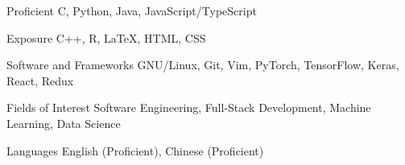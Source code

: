 

\begin{cvskills}

  \cvskill
    {Proficient} %
    {C, Python, Java, JavaScript/TypeScript} %

  \cvskill
    {Exposure} %
    {C++, R, LaTeX, HTML, CSS} %

  \cvskill
    {Software and Frameworks} %
    {GNU/Linux, Git, Vim, PyTorch, TensorFlow, Keras, React, Redux} %

  \cvskill
    {Fields of Interest} %
    {Software Engineering, Full-Stack Development, Machine Learning, Data Science} %

  \cvskill
    {Languages} %
    {English (Proficient), Chinese (Proficient)} %


\end{cvskills}
